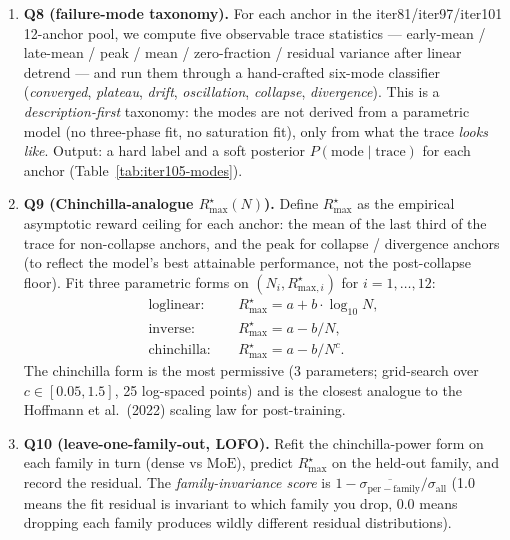 \begin{enumerate}
\item \textbf{Q8 (failure-mode taxonomy).}  For each anchor in the
iter81/iter97/iter101 12-anchor pool, we compute five observable
trace statistics --- early-mean / late-mean / peak / mean / zero-fraction /
residual variance after linear detrend --- and run them through a
hand-crafted six-mode classifier
(\emph{converged}, \emph{plateau}, \emph{drift}, \emph{oscillation},
\emph{collapse}, \emph{divergence}).  This is a
\emph{description-first} taxonomy: the modes are not derived from a
parametric model (no three-phase fit, no saturation fit), only from
what the trace \emph{looks like}.  Output: a hard label and a soft
posterior $P(\mathrm{mode} \mid \mathrm{trace})$ for each anchor
(Table~\ref{tab:iter105-modes}).

\item \textbf{Q9 (Chinchilla-analogue $R_\mathrm{max}^\star(N)$).}
Define $R_\mathrm{max}^\star$ as the empirical asymptotic reward ceiling
for each anchor: the mean of the last third of the trace for
non-collapse anchors, and the peak for collapse / divergence anchors
(to reflect the model's best attainable performance, not the
post-collapse floor).  Fit three parametric forms on
$(N_i, R_{\mathrm{max},i}^\star)$ for $i = 1, \ldots, 12$:
\begin{align*}
  \mathrm{loglinear:} \quad & R_\mathrm{max}^\star = a + b \cdot \log_{10} N, \\
  \mathrm{inverse:} \quad & R_\mathrm{max}^\star = a - b / N, \\
  \mathrm{chinchilla:} \quad & R_\mathrm{max}^\star = a - b / N^{c}.
\end{align*}
The chinchilla form is the most permissive (3 parameters; grid-search
over $c \in [0.05, 1.5]$, 25 log-spaced points) and is the closest
analogue to the Hoffmann et al.\ (2022) scaling law for
post-training.

\item \textbf{Q10 (leave-one-family-out, LOFO).}  Refit the
chinchilla-power form on each family in turn ($\mathrm{dense}$ vs
$\mathrm{MoE}$), predict $R_\mathrm{max}^\star$ on the held-out family,
and record the residual.  The \emph{family-invariance score} is
$1 - \overline{\sigma_\mathrm{per-family}} / \sigma_\mathrm{all}$
(1.0 means the fit residual is invariant to which family you drop,
0.0 means dropping each family produces wildly different residual
distributions).
\end{enumerate}

